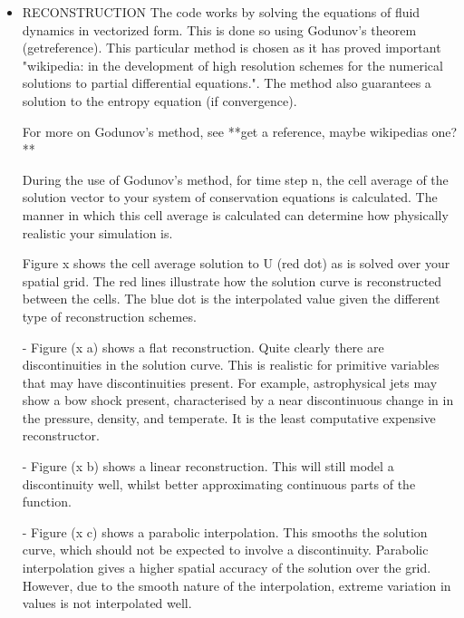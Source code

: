 \documentclass[12pt]{article}
\begin{document}
\begin{itemize}
\item RECONSTRUCTION
The code works by solving the equations of fluid dynamics in vectorized form. This is done so using Godunov's theorem (getreference). This particular method is chosen as it has proved important "wikipedia: in the  development of high resolution schemes for the numerical solutions to partial differential equations.". 
The method also guarantees a solution to the entropy equation (if convergence).

For more on Godunov's method, see **get a reference, maybe wikipedias one?**

During the use of Godunov's method, for time step n, the cell average of the solution vector to your system of conservation equations is calculated. The manner in which this cell average is calculated can determine how physically realistic your simulation is.

Figure x shows the cell average solution to U (red dot) as is solved over your spatial grid. The red lines illustrate how the solution curve is reconstructed between the cells. The blue dot is the interpolated value given the different type of reconstruction schemes.

\subitem - Figure (x a) shows a flat reconstruction. Quite clearly there are discontinuities in the solution curve. This is realistic for primitive variables that may have discontinuities present. For example, astrophysical jets may show a bow shock present, characterised by a near discontinuous change in in the pressure, density, and temperate. It is the least computative expensive reconstructor.

\subitem - Figure (x b) shows a linear reconstruction. This will still model a discontinuity well, whilst better approximating continuous parts of the function.

\subitem - Figure (x c) shows a parabolic interpolation. 
This smooths the solution curve, which should not be expected to involve a discontinuity. Parabolic interpolation gives a higher spatial accuracy of the solution over the grid. However, due to the smooth nature of the interpolation, extreme variation in values is not interpolated well.


\end{itemize}
\end{document}
